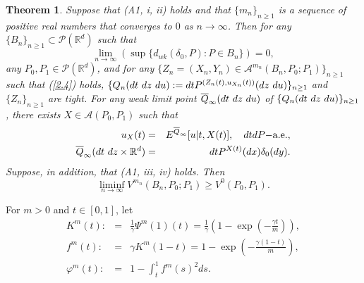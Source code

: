 \documentclass[12pt]{article}
\newtheorem{theorem}{Theorem}[section]
\begin{document}
\begin{theorem}\label {thm2.1}
Suppose that (A1, i, ii) holds and that $\{m_n\}_{n\ge 1}$ is a sequence of positive real numbers 
that converges to $0$ as $n\to\infty$.
Then for any $\{B_n\}_{n\ge 1}\subset \mathcal{P}(\mathbb{R}^d)$ such that 
$$\lim_{n\to\infty}\left(\sup\{d_{wk}
(\delta_0, P): P\in B_n\}\right)=0,$$
any $P_0,P_1\in\mathcal{P}(\mathbb{R}^d)$, 
and for any $\{Z_n=(X_n, Y_n)\in \mathcal{A}^{m_n}(B_n,P_0;P_1)\}_{n\ge 1}$ such that 
(\ref{2.4}) holds,
$\{Q_n(dt\hbox{ }dz\hbox{ }du):=dtP^{(Z_n(t),u_{X_n} (t))}(dz\hbox{ }du)\}_{n\ge 1}$ and $\{Z_n\}_{n\ge 1}$ are tight.
For any weak limit point $\overline Q_\infty(dt\hbox{ }dz\hbox{ }du)$ of $\{Q_n(dt\hbox{ }dz\hbox{ }du)\}_{n\ge 1}$,
there exists $X\in \mathcal{A}(P_0,P_1)$ such that
\begin{eqnarray}
u_X(t)&=&E^{\overline Q_\infty}[u|t,X(t)],\quad dtdP{\rm -a.e.},\label{2.13} 
\\
\overline Q_\infty(dt\hbox{ }dz\times \mathbb{R}^d)&=&dtP^{X(t)}(dx)\delta_0(dy).\label{2.14}
\end{eqnarray}
Suppose, in addition,  that (A1, iii, iv) holds. Then
\begin{equation}\label{2.15}
\liminf_{n\to \infty }V^{m_n}(B_n,P_0;P_1)\ge V^0(P_0,P_1).
\end{equation}
\end{theorem}



For $m>0$ and $t\in [0,1]$, let
\begin{eqnarray}
K^m(t):&=&\frac{1}{\gamma}\Psi^{m} (1)(t)=\frac{1}{\gamma}
\left(1- \exp\left(-\frac{\gamma t}{m}\right)\right),\label{3.7}\\
f^m(t):&=&\gamma K^m (1-t)=1- \exp\left(-\frac{\gamma (1-t)}{m}\right),\label{2.12}\\
\varphi^m(t):&=&1-\int_t^1 f^m(s)^2ds.\label{3.27}
\end{eqnarray}
\end{document}
